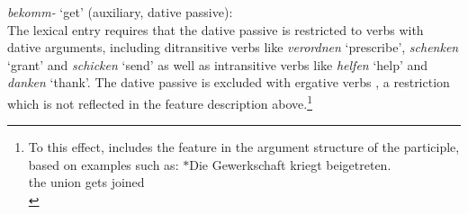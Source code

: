 \documentclass[output=paper
                ,modfonts
                ,nonflat
	        ,collection
	        ,collectionchapter
	        ,collectiontoclongg
 	        ,biblatex
                ,babelshorthands
                ,newtxmath
                ,draftmode
                ,colorlinks, citecolor=brown
]{./langsci/langscibook}
\begin{document}
\ea \label{get2}
\textit{bekomm-} `get' (auxiliary, dative passive): \\
\z 
The lexical entry requires that the dative passive is restricted to verbs with dative arguments, including ditransitive verbs like \textit{verordnen} `prescribe', \textit{schenken} `grant' and \textit{schicken} `send' as well as intransitive verbs like \textit{helfen} `help' and \textit{danken} `thank'. The dative passive is excluded with ergative verbs \citep[298]{mueller2013}, a restriction which is not reflected in the feature description above.\footnote{To this effect, \cite[298, 313]{mueller2013} includes the feature \da in the argument structure of the participle, based on examples such as:
\ea
\gll $*$Die Gewerkschaft kriegt beigetreten. \\ the union gets joined \\
\z
}
\end{document}
